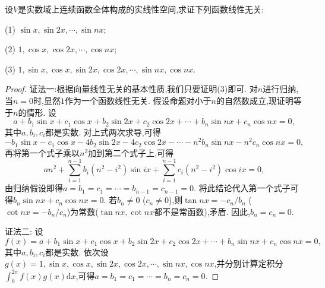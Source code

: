 \documentclass[../../main.tex]{subfiles}%
\begin{document}
\begin{example}\label{example:3.1.1.1}
设\(V\)是实数域上连续函数全体构成的实线性空间,求证下列函数线性无关:

(1) \(\sin x,\sin 2x,\cdots,\sin nx\);

(2) \(1,\cos x,\cos 2x,\cdots,\cos nx\);

(3) \(1,\sin x,\cos x,\sin 2x,\cos 2x,\cdots,\sin nx,\cos nx\).
\end{example}
\begin{proof}

{\color{blue}证法一:}根据向量线性无关的基本性质,我们只要证明(3)即可. 对\(n\)进行归纳,当\(n = 0\)时,显然\(1\)作为一个函数线性无关. 假设命题对小于\(n\)的自然数成立,现证明等于\(n\)的情形. 设
\[
a + b_1\sin x + c_1\cos x + b_2\sin 2x + c_2\cos 2x+\cdots + b_n\sin nx + c_n\cos nx = 0,
\]
其中\(a,b_i,c_i\)都是实数. 对上式两次求导,可得
\[
-b_1\sin x - c_1\cos x - 4b_2\sin 2x - 4c_2\cos 2x-\cdots - n^2b_n\sin nx - n^2c_n\cos nx = 0,
\]
再将第一个式子乘以\(n^2\)加到第二个式子上,可得
\[
an^2+\sum_{i = 1}^{n - 1}b_i(n^2 - i^2)\sin ix+\sum_{i = 1}^{n - 1}c_i(n^2 - i^2)\cos ix = 0,
\]
由归纳假设即得\(a = b_1 = c_1=\cdots = b_{n - 1} = c_{n - 1} = 0\). 将此结论代入第一个式子可得\(b_n\sin nx + c_n\cos nx = 0\). 若\(b_n\neq0\) (\(c_n\neq0\)),则\(\tan nx=-c_n/b_n\) (\(\cot nx=-b_n/c_n\))为常数($\tan nx,\cot nx$都不是常函数),矛盾. 因此,\(b_n = c_n = 0\).

{\color{blue}证法二:} 设
\[
f(x)=a + b_1\sin x + c_1\cos x + b_2\sin 2x + c_2\cos 2x+\cdots + b_n\sin nx + c_n\cos nx = 0,
\]
其中\(a,b_i,c_i\)都是实数. 依次设\(g(x)=1,\sin x,\cos x,\sin 2x,\cos 2x,\cdots,\sin nx,\cos nx\),并分别计算定积分\(\int_{0}^{2\pi}f(x)g(x)\mathrm{d}x\),可得\(a = b_1 = c_1=\cdots = b_n = c_n = 0\). 

\end{proof}
\end{document}
